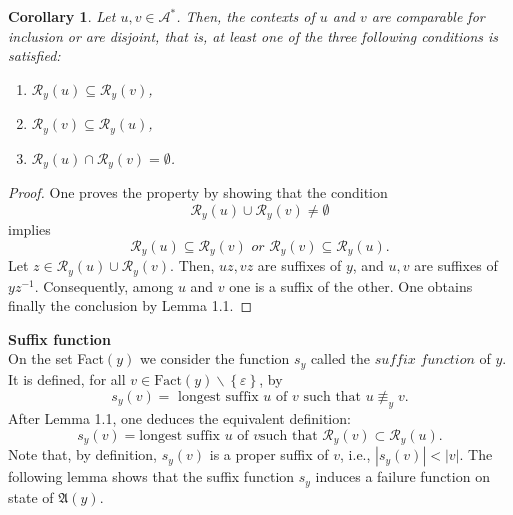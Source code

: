\documentclass[11pt]{report}
\newtheorem{corollary}[theorem]{Corollary}
\begin{document}
\begin{corollary}
Let \(u, v\in \mathcal{A}^*\). Then, the contexts of \(u\) and \(v\) are comparable for inclusion or are disjoint, that is, at least one of the three following conditions is satisfied:
\begin{enumerate}
\item \(\mathcal{R}_y(u) \subseteq \mathcal{R}_y(v)\),
\item \(\mathcal{R}_y(v) \subseteq \mathcal{R}_y(u)\),
\item \(\mathcal{R}_y(u) \cap \mathcal{R}_y(v) = \emptyset\).
\end{enumerate}
\end{corollary}
\begin{proof}
  One proves the property by showing that the
  condition $$\mathcal{R}_y(u) \cup \mathcal{R}_y(v) \not=
  \emptyset$$implies$$\mathcal{R}_y(u) \subseteq \mathcal{R}_y(v)
  \textit{  or  }
  \mathcal{R}_y(v) \subseteq \mathcal{R}_y(u).$$ Let $z \in
  \mathcal{R}_y(u) \cup \mathcal{R}_y(v)$. Then, $uz, vz$ are suffixes
  of $y$, and $u, v$ are suffixes of $yz^{-1}$. Consequently, among
  $u$ and $v$ one is a suffix of the other. One obtains finally the
  conclusion by Lemma 1.1.
\end{proof}
\noindent \textbf{Suffix function}\\
On the set Fact\((y)\) we consider the function \(s_y\) called the
\(\textit{suffix function}\) of \(y\). It is defined, for all \(v \in
\text{Fact}(y)\backslash\left\{ \varepsilon\right\}\), by$$s_y(v) =
\text{ longest suffix } u \text{ of } v \text{ such that } u
\not\equiv_y v.$$ After Lemma 1.1, one deduces the equivalent
definition:$$s_y(v) = \text{longest suffix }u \text{ of } v \text{
  such that } \mathcal{R}_y(v) \subset \mathcal{R}_y(u).$$ Note that,
by definition, $s_y(v)$ is a proper suffix of $v$, i.e., $|s_y(v)| <
|v|$. The following lemma shows that the suffix function $s_y$ induces
a failure function on state of $\mathfrak{A}(y)$.
\end{document}
